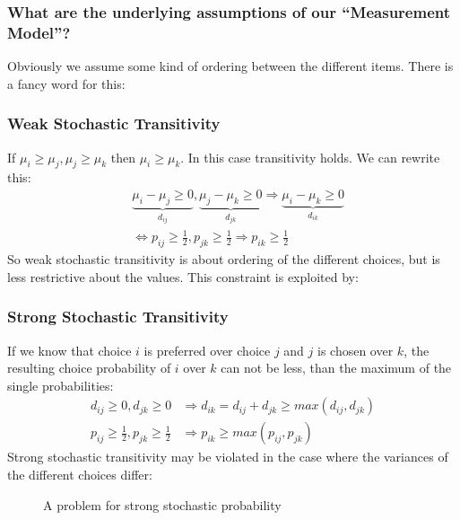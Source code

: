 \documentclass[../main/Notes.tex]{subfiles}
\begin{document}
\subsubsection{What are the underlying assumptions of our "`Measurement Model"'?}
Obviously we assume some kind of ordering between the different items. There is a fancy word for this:

\subsubsection{Weak Stochastic Transitivity}
If $\mu_i \geq \mu_j,\mu_j \geq \mu_k$ then $\mu_i \geq \mu_k$. In this case transitivity holds. We can rewrite this:
\begin{align*}
&\underbrace{\mu_i-\mu_j \geq 0}_{d_{ij}},\underbrace{\mu_j-\mu_k \geq 0}_{d_{jk}} \Rightarrow \underbrace{\mu_i-\mu_k \geq 0}_{d_{ik}}\\
&\Leftrightarrow p_{ij} \geq \frac{1}{2}, p_{jk} \geq \frac{1}{2} \Rightarrow p_{ik} \geq \frac{1}{2}
\end{align*}
So weak stochastic transitivity is about ordering of the different choices, but is less restrictive about the values. This constraint is exploited by:

\subsubsection{Strong Stochastic Transitivity}
If we know that choice $i$ is preferred over choice $j$ and $j$ is chosen over $k$, the resulting choice probability of $i$ over $k$ can not be less, than the maximum of the single probabilities:
\begin{align*}
d_{ij} \geq 0, d_{jk} \geq 0 &\Rightarrow d_{ik} = d_{ij}+d_{jk} \geq max(d_{ij},d_{jk})\\
p_{ij} \geq \frac{1}{2}, p_{jk} \geq \frac{1}{2} &\Rightarrow p_{ik} \geq max(p_{ij},p_{jk})
\end{align*}
Strong stochastic transitivity may be violated in the case where the variances of the different choices differ:
\begin{figure}[htb]
  \centering
  \caption{A problem for strong stochastic probability}
  \label{fig:2014-07-07-strongStochTrans}
\end{figure}
\end{document}
